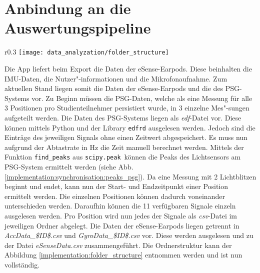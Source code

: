 \newpage
\section{Anbindung an die Auswertungspipeline}
\label{ch:Implementierung:way_to_pipeline}
\begin{wrapfigure}{r}{0.3\textwidth}
  \centering
  \texttt{[image: data\_analyzation/folder\_structure]}
  \caption{Ordnerstruktur des Datensatzes}
  \label{implementation:folder_structure}
\end{wrapfigure}
Die App liefert beim Export die Daten der eSense-Earpods.
Diese beinhalten die IMU-Daten, die Nutzer"-informationen und die Mikrofonaufnahme.
Zum aktuellen Stand liegen somit die Daten der eSense-Earpods und die des PSG-Systems vor. 
Zu Beginn müssen die PSG-Daten, welche als eine Messung für alle 3 Positionen pro Studienteilnehmer persistiert wurde, in 3 einzelne Mes"-sungen aufgeteilt werden.
Die Daten des PSG-Systems liegen als \textit{edf}-Datei vor. 
Diese können mittels Python und der Library \texttt{edfrd} ausgelesen werden.
Jedoch sind die Einträge des jeweiligen Signals ohne einen Zeitwert abgespeichert. 
Es muss nun aufgrund der Abtastrate in $\si{\hertz}$ die Zeit manuell berechnet werden. 
Mittels der Funktion \texttt{find\_peaks} aus \texttt{scipy.peak}\ können die Peaks des Lichtsensors am PSG-System ermittelt werden (siehe Abb. \ref{implementation:synchronisation:peaks_psg}).
Da eine Messung mit 2 Lichtblitzen beginnt und endet, kann nun der Start- und Endzeitpunkt einer Position ermittelt werden. 
Die einzelnen Positionen können dadurch voneinander unterschieden werden. 
Daraufhin können die 11 verfügbaren Signale einzeln ausgelesen werden.
Pro Position wird nun jedes der Signale als \textit{csv}-Datei im jeweiligen Ordner abgelegt.
Die Daten der eSense-Earpods liegen getrennt in \newline \textit{AccData\_\$ID\$.csv} und \textit{GyroData\_\$ID\$.csv} vor. 
Diese werden ausgelesen und zu der Datei \textit{eSenseData.csv} zusammengeführt.
Die Ordnerstruktur kann der Abbildung \ref{implementation:folder_structure} entnommen werden und ist nun vollständig.

